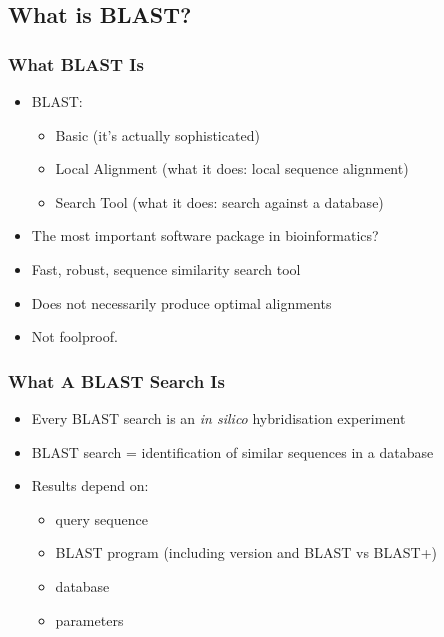 %

\subsection{What is BLAST?}
  \begin{frame}
  \frametitle{What BLAST Is}
  \begin{itemize}
    \item<1-> BLAST:
    \begin{itemize}
      \item<1-> Basic (it's actually sophisticated)
      \item<1-> Local Alignment (what it does: local sequence alignment)
      \item<1-> Search Tool (what it does: search against a database)
    \end{itemize}
    \item<2-> The most important software package in bioinformatics?
    \item<2-> Fast, robust, sequence similarity search tool
    \item<2-> Does not necessarily produce optimal alignments
    \item<2-> Not foolproof.
  \end{itemize}
\end{frame}
  
\begin{frame}
  \frametitle{What A BLAST Search Is}
  \begin{itemize}
    \item Every BLAST search is an \textit{in silico} hybridisation experiment
    \item BLAST search = identification of similar sequences in a database
    \item Results depend on:
    \begin{itemize}
      \item query sequence
      \item BLAST program (including version and BLAST vs BLAST+)
      \item database
      \item parameters
    \end{itemize}
  \end{itemize}
\end{frame}  